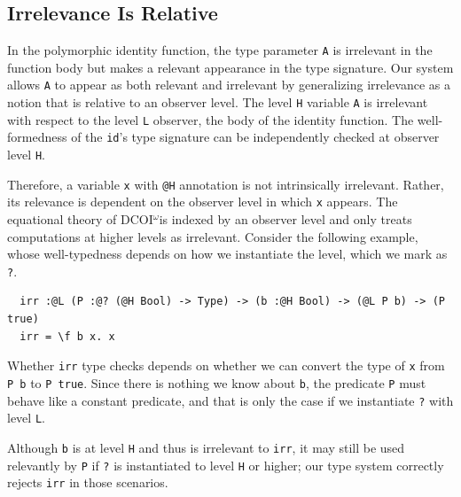 \documentclass[acmsmall]{acmart}
\makeatletter
\theoremstyle{linked}
\theoremstyle{deflinked}
\theoremstyle{acmdefinition}
\newcommand{\name}{\texorpdfstring{DCOI$^{\omega}$\@\xspace}{DCOI-omega}}
\makeatother
\begin{document}
\subsection{Irrelevance Is Relative}

In the polymorphic identity function, the type parameter \lstinline{A}
is irrelevant in the function body but makes a relevant appearance in
the type signature. Our system allows \lstinline{A} to appear as both
relevant and irrelevant by generalizing irrelevance as a notion that
is relative to an observer level. The level \lstinline{H} variable \lstinline{A}
is irrelevant with respect to the level \lstinline{L} observer, the body of the
identity function. The well-formedness of the \lstinline{id}'s type
signature can be independently checked at observer level \lstinline{H}.

Therefore, a variable \lstinline{x} with \lstinline{@H} annotation
is not intrinsically irrelevant. Rather, its
relevance is dependent on the observer level in which \lstinline{x}
appears. The equational theory of \name is indexed by an observer
level and only treats computations at higher levels as irrelevant.
Consider the following example, whose well-typedness depends on how we
instantiate the level, which we mark as \lstinline{?}.

\begin{lstlisting}
  irr :@L (P :@? (@H Bool) -> Type) -> (b :@H Bool) -> (@L P b) -> (P true)
  irr = \f b x. x
\end{lstlisting}

Whether \lstinline{irr} type checks depends on whether we can convert the
type of \lstinline{x} from \lstinline{P b} to
\lstinline{P true}. Since there is nothing we know about \lstinline{b},
the predicate \lstinline{P} must behave like a
constant predicate, and that is only the case if we instantiate \lstinline{?}
with level \lstinline{L}.

Although \lstinline{b} is at level \lstinline{H} and thus
is irrelevant to \lstinline{irr}, it may still be used relevantly by
\lstinline{P} if \lstinline{?} is instantiated to level \lstinline{H} or
higher; our type system correctly rejects \lstinline{irr}
in those scenarios.

\end{document}

